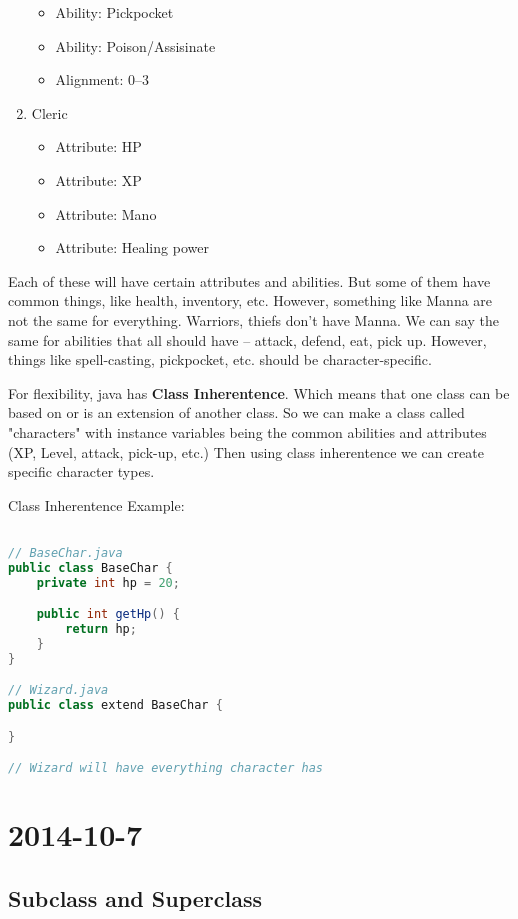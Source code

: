 \documentclass [12 pt, twoside] {article}
\begin{document}
\begin{enumerate}
\begin{itemize}
			\item Ability: Pickpocket
			\item Ability: Poison/Assisinate
			\item Alignment: 0--3
		\end{itemize}
	\item Cleric
		\begin{itemize}
			\item Attribute: HP
			\item Attribute: XP
			\item Attribute: Mano
			\item Attribute: Healing power
		\end{itemize}
\end{enumerate}


Each of these will have certain attributes and abilities.
But some of them have common things, like health, inventory, etc.
However, something like Manna are not the same for everything.
Warriors, thiefs don't have Manna.
We can say the same for abilities that all should have -- attack,
defend, eat, pick up. However, things like spell-casting, pickpocket,
etc. should be character-specific.


For flexibility, java has \textbf{Class Inherentence}. Which means
that one class can be based on or is an extension of another class.
So we can make a class called "characters" with instance variables
being the common abilities and attributes (XP, Level, attack, pick-up, 
etc.) Then using class inherentence we can create specific character types.


Class Inherentence Example:
\begin{lstlisting}[language=java]

// BaseChar.java
public class BaseChar {
	private int hp = 20;

	public int getHp() {
		return hp;
	}
}

// Wizard.java
public class extend BaseChar {

}

// Wizard will have everything character has
\end{lstlisting}


\section{2014-10-7}
\subsection{Subclass and Superclass}
\end{document}
